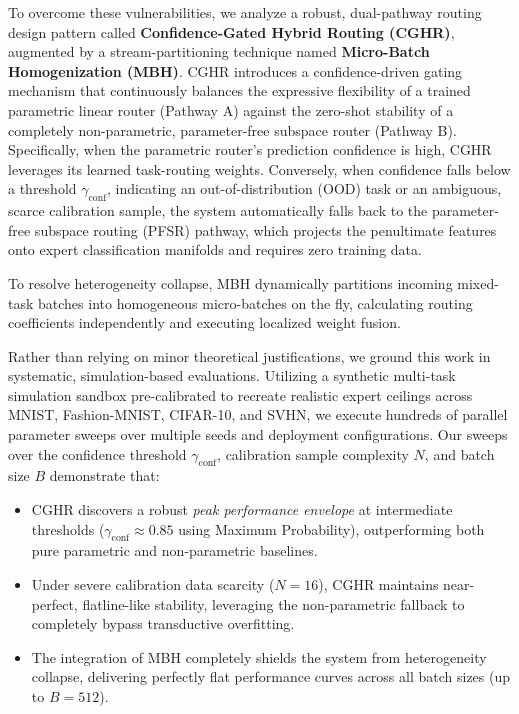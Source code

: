 To overcome these vulnerabilities, we analyze a robust, dual-pathway routing design pattern called \textbf{Confidence-Gated Hybrid Routing (CGHR)}, augmented by a stream-partitioning technique named \textbf{Micro-Batch Homogenization (MBH)}. 
CGHR introduces a confidence-driven gating mechanism that continuously balances the expressive flexibility of a trained parametric linear router (Pathway A) against the zero-shot stability of a completely non-parametric, parameter-free subspace router (Pathway B). Specifically, when the parametric router's prediction confidence is high, CGHR leverages its learned task-routing weights. Conversely, when confidence falls below a threshold $\gamma_{\text{conf}}$, indicating an out-of-distribution (OOD) task or an ambiguous, scarce calibration sample, the system automatically falls back to the parameter-free subspace routing (PFSR) pathway, which projects the penultimate features onto expert classification manifolds and requires zero training data.

To resolve heterogeneity collapse, MBH dynamically partitions incoming mixed-task batches into homogeneous micro-batches on the fly, calculating routing coefficients independently and executing localized weight fusion.

Rather than relying on minor theoretical justifications, we ground this work in systematic, simulation-based evaluations. Utilizing a synthetic multi-task simulation sandbox pre-calibrated to recreate realistic expert ceilings across MNIST, Fashion-MNIST, CIFAR-10, and SVHN, we execute hundreds of parallel parameter sweeps over multiple seeds and deployment configurations. Our sweeps over the confidence threshold $\gamma_{\text{conf}}$, calibration sample complexity $N$, and batch size $B$ demonstrate that:
\begin{itemize}
    \item CGHR discovers a robust \emph{peak performance envelope} at intermediate thresholds ($\gamma_{\text{conf}} \approx 0.85$ using Maximum Probability), outperforming both pure parametric and non-parametric baselines.
    \item Under severe calibration data scarcity ($N = 16$), CGHR maintains near-perfect, flatline-like stability, leveraging the non-parametric fallback to completely bypass transductive overfitting.
    \item The integration of MBH completely shields the system from heterogeneity collapse, delivering perfectly flat performance curves across all batch sizes (up to $B=512$).
\end{itemize}

